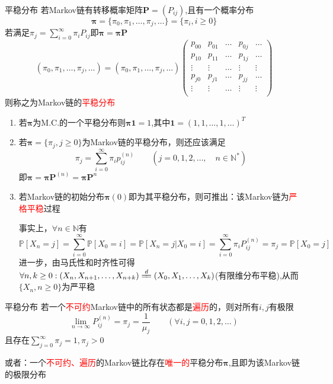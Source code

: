 \documentclass{elegantbook}
\newcommand\p{\mathbb{P}}
\begin{document}
\begin{definition}{平稳分布}{}
    若Markov链有转移概率矩阵$\bm{P}=(P_{ij})$,且有一个概率分布
    \[\bm{\pi}=\{\pi_0,\pi_1,\dots ,\pi _j,\dots \}=\{\pi _i,i\geq 0\}\]若满足$\pi _j=\sum_{i=0}^{\infty}\pi _iP_{ij}$即$\bm{\pi }=\bm{\pi }\bm{P}$
    \[(\pi_0,\pi_1,\dots ,\pi _j,\dots )=(\pi_0,\pi_1,\dots ,\pi _j,\dots )\begin{pmatrix}
      p_{00} & p_{01} & \dots & p_{0j} & \dots \\
      p_{10} & p_{11} & \dots & p_{1j} & \dots \\
      \vdots & \vdots & \dots & \vdots & \vdots \\
      p_{j0} & p_{j1} & \dots & p_{jj} & \dots \\
      \vdots & \vdots & \dots & \vdots & \vdots \\
    \end{pmatrix}\]
    则称之为Markov链的\textcolor{red}{平稳分布}
\end{definition}
\begin{remark}
    \begin{enumerate}
        \item 若$\bm{\pi }$为M.C.的一个平稳分布则$\displaystyle \bm{\pi }\mathbf{1}=1$,其中$\displaystyle \mathbf{1}=(1,1,\dots ,1,\dots )^T$
				\item 若$\bm{\pi }=\{\pi _j,j\geq 0\}$为Markov链的平稳分布，则还应该满足\[\pi _j=\sum_{i=0}^{\infty}\pi _ip_{ij}^{(n)}\qquad (j=0,1,2,\dots ,\quad n\in \mathbb{N}^*)\]
              即$\bm{\pi }=\bm{\pi }\bm{P}^{(n)}=\bm{\pi }\bm{P}^n$
        \item 若Markov链的初始分布$\bm{\pi }(0)$即为其平稳分布，则可推出：该Markov链为\textcolor{red}{严格平稳}过程
              \par 事实上，$\forall n\in \mathbb{N}$有\[\p[X_n=j]=\sum_{i=0}^{\infty}\p[X_0=i]=\p[X_n=j|X_0=i]=\sum_{i=0}^{\infty}\pi _iP_{ij}^{(n)}=\pi _j=\p[X_0=j]\]
              进一步，由马氏性和时齐性可得$\forall n,k\geq 0:(X_n,X_{n+1},\dots ,X_{n+k})\xlongequal{d}(X_0,X_1,\dots ,X_k)$(有限维分布平稳),从而$\{X_n,n\geq 0\}$为严平稳
    \end{enumerate}
\end{remark}

\begin{theorem}{平稳分布}{}
    若一个\textcolor{red}{不可约}Markov链中的所有状态都是\textcolor{red}{遍历}的，则对所有$i,j$有极限
    \[\lim_{n \to \infty}P_{ij}^{(n)}=\pi _j=\frac{1}{\mu _j}\qquad (\forall i,j=0,1,2,\dots )\]且存在$\sum_{j=0}^{\infty}\pi _j=1,\pi _j>0$
    \par 或者：一个\textcolor{red}{不可约、遍历}的Markov链比存在\textcolor{red}{唯一的}平稳分布$\bm{\pi }$,且即为该Markov链的极限分布
\end{theorem}
\end{document}

